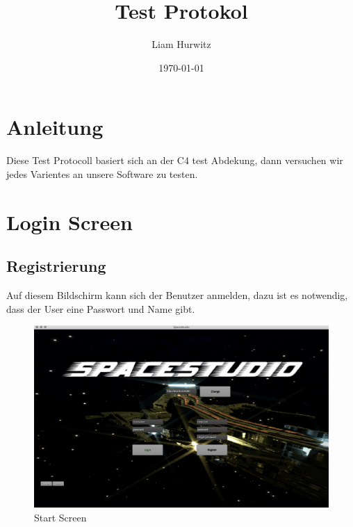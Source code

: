 \documentclass[11pt]{article}
\author{Liam Hurwitz}
\date{\today}
\title{Test Protokol}
\begin{document}
\maketitle
\newpage
\tableofcontents

\newpage
\section{Anleitung}
Diese Test Protocoll basiert sich an der C4 test Abdekung, dann versuchen wir jedes Varientes an unsere Software zu testen.

\section{Login Screen}

\label{sec:orgc5dc561}
\subsection{Registrierung}
Auf diesem Bildschirm kann sich der Benutzer anmelden, dazu ist es notwendig, dass der User eine Passwort und Name gibt.\\
\begin{figure}[htp]
\centering
\includegraphics[scale=0.3]{TestProtocolBilder/startScreen.png}
\caption{Start Screen}
\end{figure}

\newpage
\end{document}
